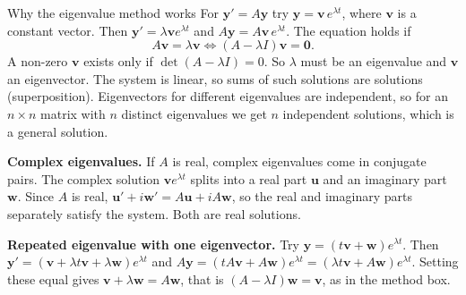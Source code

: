 \begin{derivbox}{Why the eigenvalue method works}
For $\mathbf{y}' = A\mathbf{y}$ try $\mathbf{y} = \mathbf{v}\,e^{\lambda t}$, where $\mathbf{v}$ is a constant vector. Then $\mathbf{y}' = \lambda\mathbf{v}e^{\lambda t}$ and $A\mathbf{y} = A\mathbf{v}\,e^{\lambda t}$. The equation holds if
\[ A\mathbf{v} = \lambda\mathbf{v} \iff (A - \lambda I)\mathbf{v} = \mathbf{0}. \]
A non-zero $\mathbf{v}$ exists only if $\det(A-\lambda I) = 0$. So $\lambda$ must be an eigenvalue and $\mathbf{v}$ an eigenvector. The system is linear, so sums of such solutions are solutions (superposition). Eigenvectors for different eigenvalues are independent, so for an $n\times n$ matrix with $n$ distinct eigenvalues we get $n$ independent solutions, which is a general solution.

\textbf{Complex eigenvalues.} If $A$ is real, complex eigenvalues come in conjugate pairs. The complex solution $\mathbf{v}e^{\lambda t}$ splits into a real part $\mathbf{u}$ and an imaginary part $\mathbf{w}$. Since $A$ is real, $\mathbf{u}'+i\mathbf{w}' = A\mathbf{u} + iA\mathbf{w}$, so the real and imaginary parts separately satisfy the system. Both are real solutions.

\textbf{Repeated eigenvalue with one eigenvector.} Try $\mathbf{y} = (t\mathbf{v} + \mathbf{w})e^{\lambda t}$. Then $\mathbf{y}' = (\mathbf{v} + \lambda t\mathbf{v} + \lambda\mathbf{w})e^{\lambda t}$ and $A\mathbf{y} = (tA\mathbf{v} + A\mathbf{w})e^{\lambda t} = (\lambda t\mathbf{v} + A\mathbf{w})e^{\lambda t}$. Setting these equal gives $\mathbf{v} + \lambda\mathbf{w} = A\mathbf{w}$, that is $(A - \lambda I)\mathbf{w} = \mathbf{v}$, as in the method box.
\end{derivbox}

